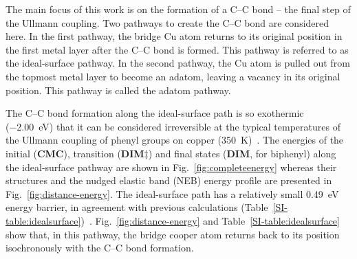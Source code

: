 \documentclass[aps,prb,amsmath,amssymb,11pt]{revtex4-1}
\begin{document}
The main focus of this work is on the formation of a C--C bond -- the final step of the Ullmann coupling. 
Two pathways to create the C--C bond are considered here. 
In the first pathway, the bridge Cu atom returns to its original position in the first metal layer after the C--C bond is formed. This pathway is referred to as the ideal-surface pathway.
In the second pathway, the Cu atom is pulled out from the topmost metal layer to become an adatom, leaving a vacancy in its original position. This pathway is called the adatom pathway.

The C--C bond formation along the ideal-surface path is so exothermic (\SI{-2.00}{\electronvolt}) that it can be considered irreversible at the typical temperatures of the Ullmann coupling of phenyl groups on copper (\SI{350}{\kelvin})~\cite{ullmann_67, sur_sci01}. The energies of the initial (\textbf{CMC}), transition (\textbf{DIM$\ddagger$}) and final states (\textbf{DIM}, for biphenyl) along the ideal-surface pathway are shown in Fig.~\ref{fig:completeenergy} whereas their structures and the nudged elastic band (NEB) energy profile are presented in Fig.~\ref{fig:distance-energy}. 
The ideal-surface path has a relatively small \SI{0.49}{\electronvolt} energy barrier, in agreement with previous calculations (Table~\ref{SI-table:idealsurface})~\cite{pccp2010, jacs2013}. %
Fig.~\ref{fig:distance-energy} and Table~\ref{SI-table:idealsurface} show that, in this pathway, the bridge cooper atom returns back to its position isochronously with the C--C bond formation. 
\end{document}
